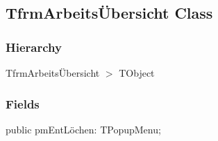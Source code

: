 \documentclass{report}
\newif\ifpdf
\begin{document}
\subsection*{TfrmArbeitsÜbersicht Class}
\fi
\label{ok_unicode_identifiers_utf8.TfrmArbeitsÜbersicht}
\subsubsection*{\large{\textbf{Hierarchy}}\normalsize\hspace{1ex}\hfill}
TfrmArbeitsÜbersicht {$>$} TObject
\subsubsection*{\large{\textbf{Fields}}\normalsize\hspace{1ex}\hfill}
\begin{list}{}{
\setlength{\itemindent}{0cm}
\setlength{\listparindent}{0cm}
\setlength{\leftmargin}{\evensidemargin}
\addtolength{\leftmargin}{\tmplength}
\settowidth{\labelsep}{X}
\addtolength{\leftmargin}{\labelsep}
\setlength{\labelwidth}{\tmplength}
}
\label{ok_unicode_identifiers_utf8.TfrmArbeitsÜbersicht-pmEntLöchen}
\item[\textbf{pmEntLöchen}\hfill]
\ifpdf
\begin{flushleft}
\fi
\begin{ttfamily}
public pmEntLöchen: TPopupMenu;\end{ttfamily}

\ifpdf
\end{flushleft}
\fi


\par  \end{list}
\end{document}
